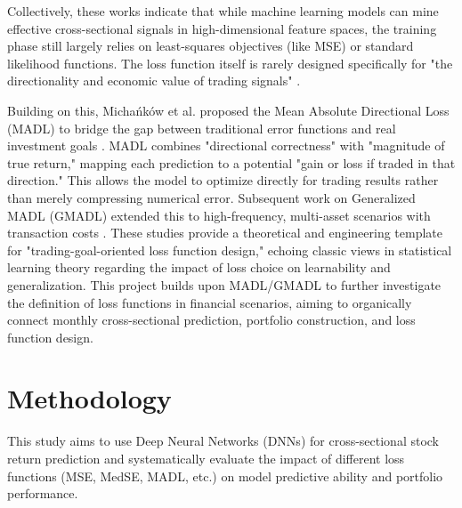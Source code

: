 \documentclass[openany]{book}
\numberwithin{figure}{chapter}
\numberwithin{equation}{chapter}
\begin{document}
Collectively, these works indicate that while machine learning models can mine effective cross-sectional signals in high-dimensional feature spaces, the training phase still largely relies on least-squares objectives (like MSE) or standard likelihood functions. The loss function itself is rarely designed specifically for "the directionality and economic value of trading signals" \cite{gu2020empirical}.

Building on this, Michańków et al. proposed the Mean Absolute Directional Loss (MADL) to bridge the gap between traditional error functions and real investment goals \cite{michankow2024mean}. MADL combines "directional correctness" with "magnitude of true return," mapping each prediction to a potential "gain or loss if traded in that direction." This allows the model to optimize directly for trading results rather than merely compressing numerical error. Subsequent work on Generalized MADL (GMADL) extended this to high-frequency, multi-asset scenarios with transaction costs \cite{michankow2024generalized}. These studies provide a theoretical and engineering template for "trading-goal-oriented loss function design," echoing classic views in statistical learning theory regarding the impact of loss choice on learnability and generalization. This project builds upon MADL/GMADL to further investigate the definition of loss functions in financial scenarios, aiming to organically connect monthly cross-sectional prediction, portfolio construction, and loss function design.

\chapter{Methodology}

This study aims to use Deep Neural Networks (DNNs) for cross-sectional stock return prediction and systematically evaluate the impact of different loss functions (MSE, MedSE, MADL, etc.) on model predictive ability and portfolio performance.
\end{document}
